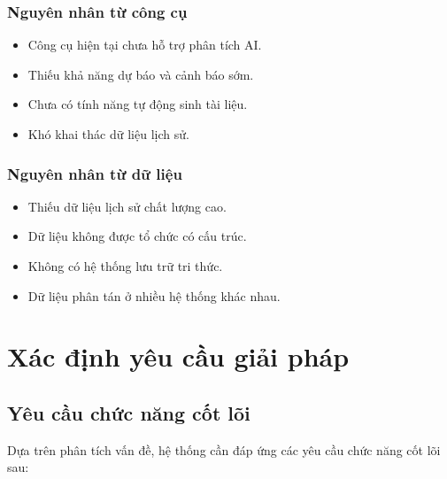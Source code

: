 \documentclass[12pt,a4paper]{report}
\begin{document}
\subsubsection{Nguyên nhân từ công cụ}

\begin{itemize}
\item Công cụ hiện tại chưa hỗ trợ phân tích AI.
\item Thiếu khả năng dự báo và cảnh báo sớm.
\item Chưa có tính năng tự động sinh tài liệu.
\item Khó khai thác dữ liệu lịch sử.
\end{itemize}

\subsubsection{Nguyên nhân từ dữ liệu}

\begin{itemize}
\item Thiếu dữ liệu lịch sử chất lượng cao.
\item Dữ liệu không được tổ chức có cấu trúc.
\item Không có hệ thống lưu trữ tri thức.
\item Dữ liệu phân tán ở nhiều hệ thống khác nhau.
\end{itemize}

\section{Xác định yêu cầu giải pháp}

\subsection{Yêu cầu chức năng cốt lõi}

Dựa trên phân tích vấn đề, hệ thống cần đáp ứng các yêu cầu chức năng cốt lõi sau:
\end{document}
